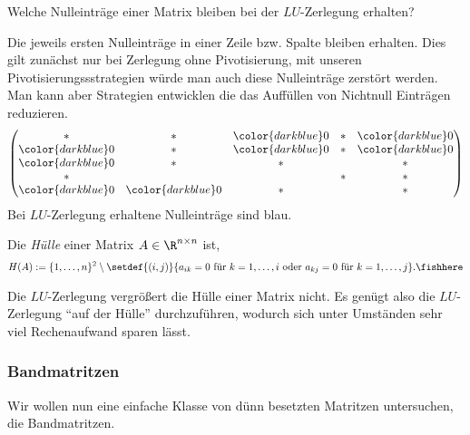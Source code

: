 \begin{bemn}[Frage:]
Welche Nulleinträge einer Matrix bleiben bei der $LU$-Zerlegung erhalten?
\end{bemn}
\begin{bemn}[Antwort:]
Die jeweils ersten Nulleinträge in einer Zeile bzw. Spalte bleiben erhalten.
Dies gilt zunächst nur bei Zerlegung ohne Pivotisierung, mit unseren
Pivotisierungssstrategien würde man auch diese Nulleinträge zerstört werden.
Man kann aber Strategien entwicklen die das Auffüllen von Nichtnull Einträgen
reduzieren.
\begin{align*}
\begin{pmatrix}
*  & * & {\color{darkblue}0} & * & {\color{darkblue}0}\\
{\color{darkblue}0}  & * & {\color{darkblue}0} & * & {\color{darkblue}0}\\
{\color{darkblue}0}  & * & * &  & *\\
*  &   &   & * & *\\
{\color{darkblue}0}  & {\color{darkblue}0} & * &   & *   
\end{pmatrix}
\end{align*}
Bei $LU$-Zerlegung erhaltene Nulleinträge sind blau.
\end{bemn}

\begin{defn}
\label{defn:2.6}
Die \emph{Hülle} einer Matrix $A\in\R^{n\times n}$ ist,
\begin{align*}
H(A) := \{1,\ldots,n\}^2 \setminus \setdef{(i,j)}{a_{ik}=0\text{ für
}k=1,\ldots,i\text{ oder }a_{kj}=0\text{ für }k=1,\ldots,j}.\fishhere
\end{align*}
\end{defn}
Die $LU$-Zerlegung vergrößert die Hülle einer Matrix nicht. Es genügt also die
$LU$-Zerlegung ``auf der Hülle'' durchzuführen, wodurch sich unter Umständen
sehr viel Rechenaufwand sparen lässt.

\subsubsection{Bandmatritzen}

Wir wollen nun eine einfache Klasse von dünn besetzten Matritzen untersuchen,
die Bandmatritzen.

